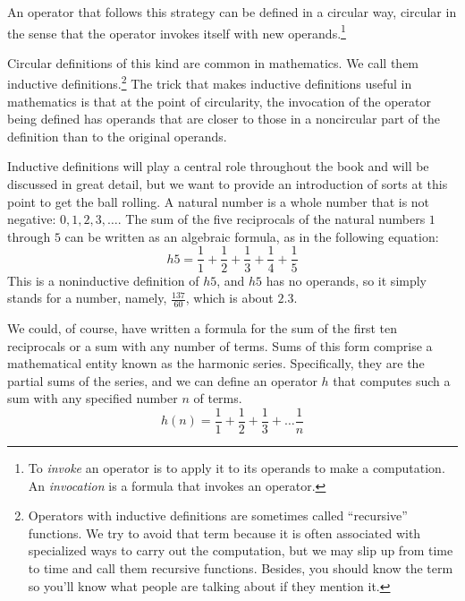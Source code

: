 An operator that follows this strategy can be defined
in a circular way, circular in the sense that
the operator invokes itself with new operands.\footnote{To
\emph{invoke}
an operator is to apply it to its operands
to make a computation.
An \emph{invocation} is a formula that invokes an operator.}

Circular definitions of this kind are common in mathematics.
We call them inductive definitions.\footnote{Operators with
inductive definitions
are sometimes called ``recursive'' functions.
We try to avoid that term because it is
often associated with specialized ways to carry out the computation,
but we may slip up from time to time and call them recursive functions.
Besides, you should know the term so you'll know what people are
talking about if they mention it.}
The trick that makes inductive definitions useful in mathematics
is that at the point of circularity,
the invocation of the operator being defined
has operands that are closer to those in a noncircular part of the
definition than to the original operands.

Inductive definitions
will play a central role throughout the book
and will be discussed in great detail, but we want to provide an
introduction of sorts at this point to get the ball rolling.
A natural number is a whole number that is not negative: $0, 1, 2, 3, \dots$.
The sum of the five reciprocals of the
natural numbers $1$ through $5$
can be written as an algebraic formula, as in the following equation:
\begin{displaymath}
h5 = \frac{1}{1} + \frac{1}{2} + \frac{1}{3} + \frac{1}{4} + \frac{1}{5}
\end{displaymath}
This is a noninductive definition of $h5$,
and $h5$ has no operands, so it simply stands for a number,
namely, $\frac{137}{60}$, which is about $2.3$.

We could, of course, have written a formula for the sum
of the first ten reciprocals or a sum with any number of terms.
Sums of this form comprise a mathematical entity known as
the harmonic series.
Specifically, they are the partial sums of the series,
and we can define an operator $h$ that computes such a sum
with any specified number $n$ of terms.
\begin{displaymath}
h(n) = \frac{1}{1} + \frac{1}{2} + \frac{1}{3} + \dots  \frac{1}{n}
\end{displaymath}

